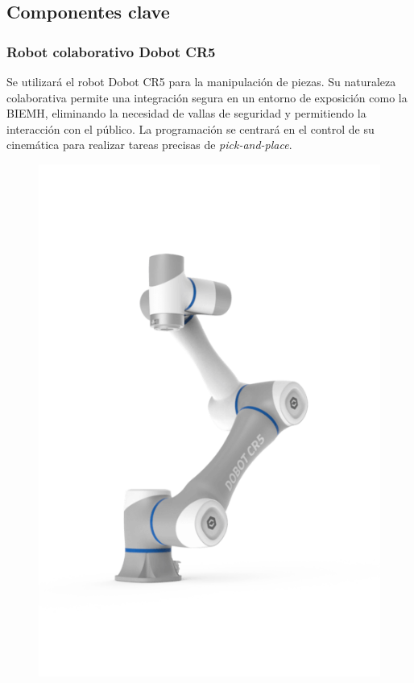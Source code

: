\documentclass[12pt, a4paper]{article}
\begin{document}
\subsection{Componentes clave}

\subsubsection{Robot colaborativo Dobot CR5}
Se utilizará el robot Dobot CR5 para la manipulación de piezas. Su naturaleza colaborativa permite una integración segura en un entorno de exposición como la BIEMH, eliminando la necesidad de vallas de seguridad y permitiendo la interacción con el público. La programación se centrará en el control de su cinemática para realizar tareas precisas de \textit{pick-and-place}.

\begin{figure}[h!]
    \centering
    \begin{minipage}{0.45\textwidth}
        \centering
        \includegraphics[width=\textwidth]{dobot.png}

\end{minipage}
\end{figure}
\end{document}

